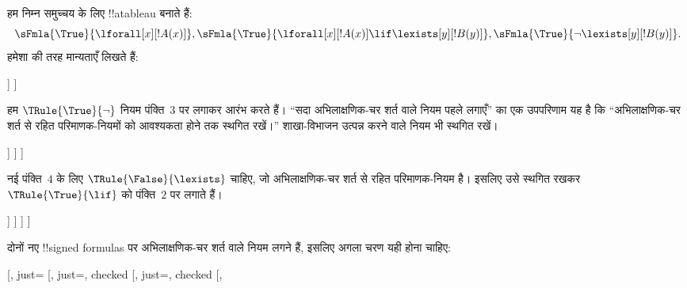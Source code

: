 \documentclass[../../../include/open-logic-section]{subfiles}
\begin{document}
\begin{ex}
हम निम्न समुच्चय के लिए !!a{tableau} बनाते हैं:
\[
\sFmla{\True}{\lforall[x][!A(x)]}, \sFmla{\True}{\lforall[x][!A(x)] 
  \lif \lexists[y][!B(y)]}, \sFmla{\True}{\lnot\lexists[y][!B(y)]}.
\]
हमेशा की तरह मान्यताएँ लिखते हैं:
\begin{oltableau}
  [\sFmla{\True}{\lforall[x][\formula{A}(x)]}, just=\TAss
    [\sFmla{\True}{\lforall[x][\formula{A}(x)] \lif
        \lexists[y][\formula{B}(y)]}, just=\TAss
      [\sFmla{\True}{\lnot\lexists[y][\formula{B}(y)]}, just=\TAss
      ]
    ]
  ]
\end{oltableau}
हम $\TRule{\True}{\lnot}$ नियम पंक्ति~$3$ पर लगाकर आरंभ करते हैं। ``सदा
अभिलाक्षणिक-चर शर्त वाले नियम पहले लगाएँ'' का एक उपपरिणाम यह है कि
``अभिलाक्षणिक-चर शर्त से रहित परिमाणक-नियमों को आवश्यकता होने तक स्थगित
रखें।'' शाखा-विभाजन उत्पन्न करने वाले नियम भी स्थगित रखें।
\begin{oltableau}
  [\sFmla{\True}{\lforall[x][\formula{A}(x)]}, just=\TAss
    [\sFmla{\True}{\lforall[x][\formula{A}(x)] \lif
        \lexists[y][\formula{B}(y)]}, just=\TAss
      [\sFmla{\True}{\lnot\lexists[y][\formula{B}(y)]}, just=\TAss, checked
        [\sFmla{\False}{\lexists[y][\formula{B}(y)]}, just={\TRule{\True}{\lnot}[3]}]
      ]
    ]
  ]
\end{oltableau}
नई पंक्ति~$4$ के लिए $\TRule{\False}{\lexists}$ चाहिए, जो अभिलाक्षणिक-चर
शर्त से रहित परिमाणक-नियम है। इसलिए उसे स्थगित रखकर
$\TRule{\True}{\lif}$ को पंक्ति~$2$ पर लगाते हैं।
\begin{oltableau}
  [\sFmla{\True}{\lforall[x][\formula{A}(x)]}, just=\TAss
    [\sFmla{\True}{\lforall[x][\formula{A}(x)] \lif
        \lexists[y][\formula{B}(y)]}, just=\TAss, checked
      [\sFmla{\True}{\lnot\lexists[y][\formula{B}(y)]}, just=\TAss, checked
        [\sFmla{\False}{\lexists[y][\formula{B}(y)]},
          just={\TRule{\True}{\lnot}[3]},
          [\sFmla{\False}{\lforall[x][\formula{A}(x)]}, just={\TRule{\True}{\lif}[2]}]
          [\sFmla{\True}{\lexists[y][\formula{B}(y)]}, just={\TRule{\True}{\lif}[2]}]
        ]
      ]
    ]
  ]
\end{oltableau}
दोनों नए !!{signed formula}s पर अभिलाक्षणिक-चर शर्त वाले नियम लगने हैं,
इसलिए अगला चरण यही होना चाहिए:
\begin{oltableau}
  [\sFmla{\True}{\lforall[x][\formula{A}(x)]}, just=\TAss
    [\sFmla{\True}{\lforall[x][\formula{A}(x)] \lif
        \lexists[y][\formula{B}(y)]}, just=\TAss, checked
      [\sFmla{\True}{\lnot\lexists[y][\formula{B}(y)]}, just=\TAss, checked
        [\sFmla{\False}{\lexists[y][\formula{B}(y)]},

\end{oltableau}
\end{ex}
\end{document}
